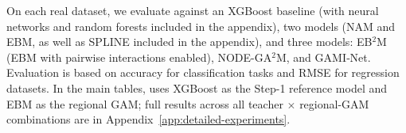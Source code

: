 On each real dataset, we evaluate \method{} against an XGBoost baseline (with neural networks and random forests included in the appendix), two \gam{}models (NAM and EBM, as well as SPLINE included in the appendix), and three \gamm{} models: EB$^2$M (EBM with pairwise interactions enabled), NODE-GA$^2$M, and GAMI‐Net. Evaluation is based on accuracy for classification tasks and RMSE for regression datasets. In the main tables, \method{} uses XGBoost as the Step-1 reference model and EBM as the regional GAM; full results across all teacher $\times$ regional-GAM combinations are in Appendix~\ref{app:detailed-experiments}.

\begin{table}
\caption{Classification accuracy vs.\ baselines (mean $\pm$ std.\ dev.\ over 5-fold CV).
\textbf{}/\textbf{} denotes strictly higher/lower accuracy than \method{};
\textbf{$\mathbf{=}$} denotes exactly equal accuracy to \method{}.}
\label{tab:clf-acc}
\centering
{}
\end{table}
